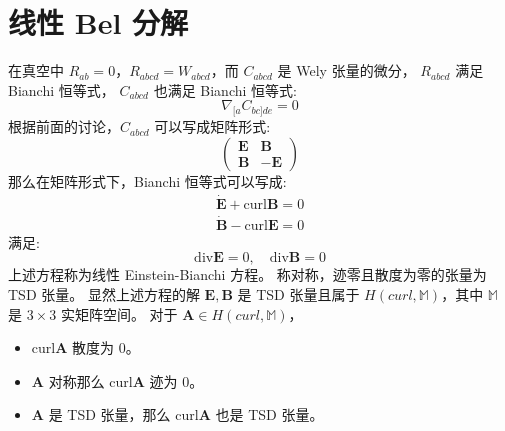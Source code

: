 \documentclass[lang=cn,a4paper,newtx]{elegantpaper}
\begin{document}
\section{线性 Bel 分解}
在真空中 $R_{ab} = 0$，$R_{abcd} = W_{abcd}$，而 $C_{abcd}$ 是 Wely 张量的微分，
$R_{abcd}$ 满足 Bianchi 恒等式， $C_{abcd}$ 也满足 Bianchi 恒等式:
$$
\nabla_{[a}C_{bc]de} = 0
$$
根据前面的讨论，$C_{abcd}$ 可以写成矩阵形式:
$$
\begin{pmatrix}
    \boldsymbol{E} & \boldsymbol{B}\\
    \boldsymbol{B} & -\boldsymbol{E}
\end{pmatrix}
$$
那么在矩阵形式下，Bianchi 恒等式可以写成:
\begin{align}
    \boldsymbol{\dot{E}} + \mathrm{curl}\boldsymbol{B} = 0\\
    \boldsymbol{\dot{B}} - \mathrm{curl}\boldsymbol{E} = 0
\end{align}
满足:
$$
\mathrm{div}\boldsymbol{E} = 0, \quad \mathrm{div}\boldsymbol{B} = 0
$$
上述方程称为线性 Einstein-Bianchi 方程。
称对称，迹零且散度为零的张量为 TSD 张量。
显然上述方程的解 $\boldsymbol{E}, \boldsymbol{B}$ 是 TSD 张量且属于 $H(curl,
\mathbb{M})$，其中 $\mathbb{M}$ 是 $3\times 3$ 实矩阵空间。
对于 $\boldsymbol{A} \in H(curl, \mathbb{M})$，
\begin{itemize}
    \item $\mathrm{curl}\boldsymbol{A}$ 散度为 0。
    \item $\boldsymbol{A}$ 对称那么 $\mathrm{curl}\boldsymbol{A}$ 迹为 0。
    \item $\boldsymbol{A}$ 是 TSD 张量，那么 $\mathrm{curl}\boldsymbol{A}$ 也是
        TSD 张量。
\end{itemize}
\end{document}
